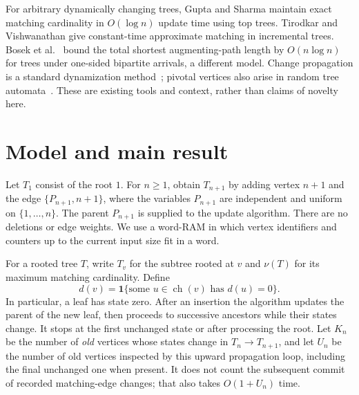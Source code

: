 \documentclass[runningheads,envcountsame,orivec]{llncs}
\newcommand{\ind}{\mathbf 1}
\newcommand{\ch}{\operatorname{ch}}
\begin{document}
For arbitrary dynamically changing trees, Gupta and Sharma
\cite{GuptaSharma2009} maintain exact matching cardinality in
$O(\log n)$ update time using top trees. Tirodkar and Vishwanathan
\cite{TirodkarVishwanathan2018} give constant-time approximate matching
in incremental trees. Bosek et al.\ \cite{Bosek2018} bound the total
shortest augmenting-path length by $O(n\log n)$ for trees under
one-sided bipartite arrivals, a different model. Change propagation is
a standard dynamization method~\cite{Acar2004}; pivotal vertices also
arise in random tree automata~\cite{Johnson2020}. These are existing
tools and context, rather than claims of novelty here.

\section{Model and main result}\label{sec:model}

Let $T_1$ consist of the root $1$. For $n\ge1$, obtain $T_{n+1}$ by adding
vertex $n+1$ and the edge $\{P_{n+1},n+1\}$, where the variables
$P_{n+1}$ are independent and uniform on $\{1,\ldots,n\}$. The parent
$P_{n+1}$ is supplied to the update algorithm. There are no deletions or
edge weights. We use a word-RAM in which vertex identifiers and counters
up to the current input size fit in a word.

For a rooted tree $T$, write $T_v$ for the subtree rooted at $v$ and
$\nu(T)$ for its maximum matching cardinality. Define
\begin{equation}\label{eq:state}
 d(v)=\ind\{\text{some }u\in\ch(v)\text{ has }d(u)=0\}.
\end{equation}
In particular, a leaf has state zero. After an insertion the algorithm
updates the parent of the new leaf, then proceeds to successive ancestors
while their states change. It stops at the first unchanged state or after
processing the root. Let $K_n$ be the number of \emph{old} vertices whose
states change in $T_n\to T_{n+1}$, and let $U_n$ be the number of old
vertices inspected by this upward propagation loop, including the final
unchanged one when present. It does not count the subsequent commit of
recorded matching-edge changes; that also takes $O(1+U_n)$ time.
\end{document}
